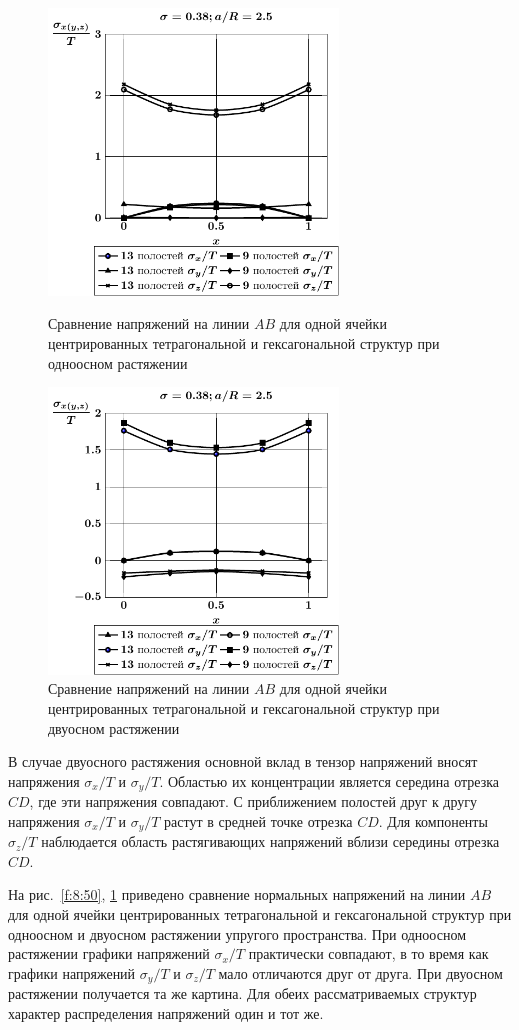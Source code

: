\begin{figure}[h!]
\centering\footnotesize
\parbox[b]{7.5cm}{\centering\includegraphics[width=7.7cm]{spheres-cav13-9-a25-t1.pdf}
\caption{Сравнение напряжений на линии $AB$ для одной ячейки центрированных тетрагональной и гексагональной структур при одноосном растяжении
\label{f:8:50}}}\hfil\hfil
\parbox[b]{7.5cm}{\centering\includegraphics[width=7.7cm]{spheres-cav13-9-a25-t2.pdf}
\caption{Сравнение напряжений на линии $AB$ для одной ячейки центрированных тетрагональной и гексагональной структур при двуосном растяжении
\label{f:8:51}}}
\end{figure}

В случае двуосного растяжения основной вклад в тензор напряжений вносят напряжения $\sigma_x/T$ и $\sigma_y/T$. Областью их концентрации является середина отрезка $CD$, где эти напряжения совпадают. С приближением полостей друг к другу напряжения $\sigma_x/T$ и $\sigma_y/T$ растут в средней точке отрезка $CD$. Для компоненты $\sigma_z/T$ наблюдается область растягивающих напряжений вблизи середины отрезка $CD$.

На рис.~\ref{f:8:50}, \ref{f:8:51} приведено сравнение нормальных напряжений на линии $AB$ для одной ячейки центрированных тетрагональной и гексагональной структур при одноосном и двуосном растяжении упругого пространства. При одноосном растяжении графики напряжений $\sigma_x/T$ практически совпадают, в то время как графики напряжений $\sigma_y/T$ и $\sigma_z/T$ мало отличаются друг от друга. При двуосном растяжении получается та же картина. Для обеих рассматриваемых структур характер распределения напряжений один и тот же.

